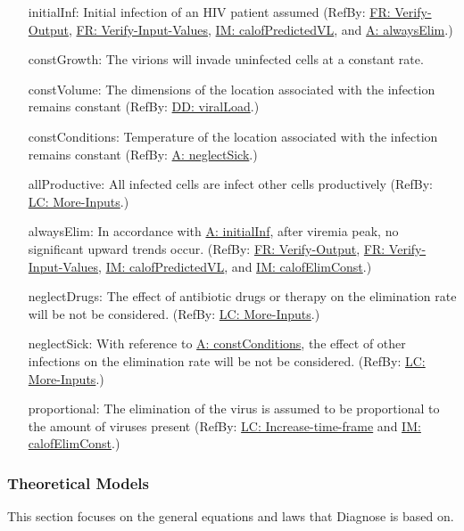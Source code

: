 \documentclass[12pt]{article}
\begin{document}
\begin{itemize}
\item[initialInf:\phantomsection\label{initialInf}]{Initial infection of an HIV patient assumed (RefBy: \hyperref[verifyOutput]{FR: Verify-Output}, \hyperref[verifyInput]{FR: Verify-Input-Values}, \hyperref[IM:calofPredictedVL]{IM: calofPredictedVL}, and \hyperref[alwaysElim]{A: alwaysElim}.)}
\item[constGrowth:\phantomsection\label{constGrowth}]{The virions will invade uninfected cells at a constant rate.}
\item[constVolume:\phantomsection\label{constVolume}]{The dimensions of the location associated with the infection remains constant (RefBy: \hyperref[DD:viralLoad]{DD: viralLoad}.)}
\item[constConditions:\phantomsection\label{constConditions}]{Temperature of the location associated with the infection remains constant (RefBy: \hyperref[neglectSick]{A: neglectSick}.)}
\item[allProductive:\phantomsection\label{allProductive}]{All infected cells are infect other cells productively (RefBy: \hyperref[moreInputs]{LC: More-Inputs}.)}
\item[alwaysElim:\phantomsection\label{alwaysElim}]{In accordance with \hyperref[initialInf]{A: initialInf}, after viremia peak, no significant upward trends occur. (RefBy: \hyperref[verifyOutput]{FR: Verify-Output}, \hyperref[verifyInput]{FR: Verify-Input-Values}, \hyperref[IM:calofPredictedVL]{IM: calofPredictedVL}, and \hyperref[IM:calofElimConst]{IM: calofElimConst}.)}
\item[neglectDrugs:\phantomsection\label{neglectDrugs}]{The effect of antibiotic drugs or therapy on the elimination rate will be not be considered. (RefBy: \hyperref[moreInputs]{LC: More-Inputs}.)}
\item[neglectSick:\phantomsection\label{neglectSick}]{With reference to \hyperref[constConditions]{A: constConditions}, the effect of other infections on the elimination rate will be not be considered. (RefBy: \hyperref[moreInputs]{LC: More-Inputs}.)}
\item[proportional:\phantomsection\label{proportional}]{The elimination of the virus is assumed to be proportional to the amount of viruses present (RefBy: \hyperref[incTimeFrame]{LC: Increase-time-frame} and \hyperref[IM:calofElimConst]{IM: calofElimConst}.)}
\end{itemize}
\subsubsection{Theoretical Models}
\label{Sec:TMs}
This section focuses on the general equations and laws that Diagnose is based on.
\end{document}
